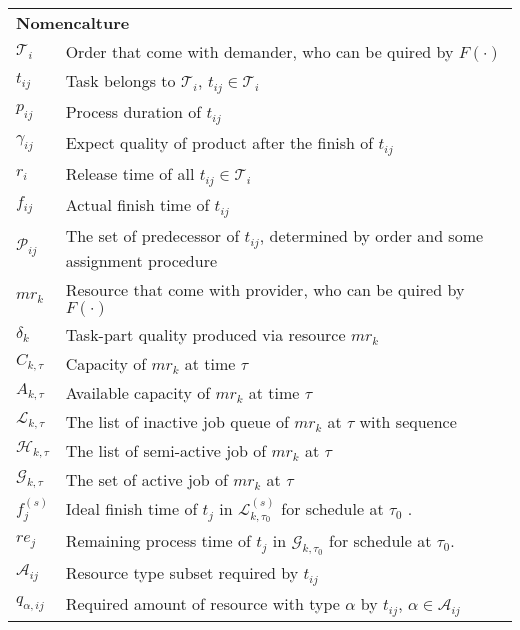 \begin{table}[htbp]
  \scriptsize
\begin{tabularx}{\textwidth}{|lX|}
    \hline
    \multicolumn{2}{|l|}{\multirow{2}[0]{*}{\textbf{Nomencalture}}} \\
    \multicolumn{2}{|l|}{} \\
	$\mathcal{T}_i$ & Order that come with demander, who can be quired by $F(\cdot)$ \\
	$t_{ij}$ & Task belongs to $\mathcal{T}_i$, $t_{ij}\in\mathcal{T}_i$ \\
	$p_{ij}$ & Process duration of $t_{ij}$\\
	$\gamma_{ij}$ & Expect quality of product after the finish of $t_{ij}$\\
	$r_i$ & Release time of all $t_{ij}\in\mathcal{T}_i$\\
	$f_{ij}$ & Actual finish time of $t_{ij}$ \\
	$\mathcal{P}_{ij}$ & The set of predecessor of $t_{ij}$, determined by order and some assignment procedure\\
	$mr_k$ & Resource that come with provider, who can be quired by $F(\cdot)$ \\
	$\delta_k$ & Task-part quality produced via resource $mr_k$ \\
	$C_{k,\tau}$ & Capacity of $mr_k$ at time $\tau$\\
	$A_{k,\tau}$ & Available capacity of $mr_k$ at time $\tau$\\
	$\mathcal{L}_{k,\tau}$ & The list of inactive job queue of $mr_k$ at $\tau$ with sequence\\
	$\mathcal{H}_{k,\tau}$ & The list of semi-active job of $mr_k$ at $\tau$ \\
	$\mathcal{G}_{k,\tau}$ & The set of active job of $mr_k$ at $\tau$ \\
	$f^{(s)}_j$ & Ideal finish time of $t_j$ in $\mathcal{L}^{(s)}_{k,\tau_0}$ for schedule at $\tau_0$ . \\
	$re_j$ & Remaining process time of $t_j$ in $\mathcal{G}_{k,\tau_0}$ for schedule at $\tau_0$. \\
	$\mathcal{A}_{ij}$ & Resource type subset required by $t_{ij}$\\ %
	$q_{\alpha,ij}$ & Required amount of resource with type $\alpha$ by $t_{ij}$, $\alpha\in\mathcal{A}_{ij}$\\

\end{tabularx}
\end{table}
